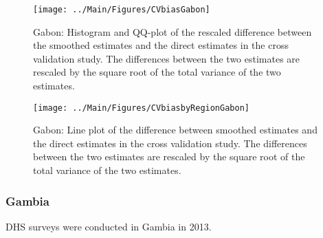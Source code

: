 \documentclass[12pt]{article}\usepackage[]{graphicx}\usepackage[]{color}
\newenvironment{knitrout}{}{} %
\begin{document}
\begin{knitrout}
\color{fgcolor}\begin{figure}[bht]

{\centering \texttt{[image: ../Main/Figures/CVbiasGabon]} 

}

\caption[Gabon]{Gabon: Histogram and QQ-plot of the rescaled difference between the smoothed estimates and the direct estimates in the cross validation study. The differences between the two estimates are rescaled by the square root of the total variance of the two estimates.}\label{fig:unnamed-chunk-129}
\end{figure}


\end{knitrout}

\begin{knitrout}
\color{fgcolor}\begin{figure}[bht]

{\centering \texttt{[image: ../Main/Figures/CVbiasbyRegionGabon]} 

}

\caption[Gabon]{Gabon: Line plot of the difference between smoothed estimates and the direct estimates in the cross validation study. The differences between the two estimates are rescaled by the square root of the total variance of the two estimates.}\label{fig:unnamed-chunk-130}
\end{figure}


\end{knitrout}

\clearpage
\subsubsection{Gambia}





DHS surveys were conducted in Gambia in 2013.
\end{document}
